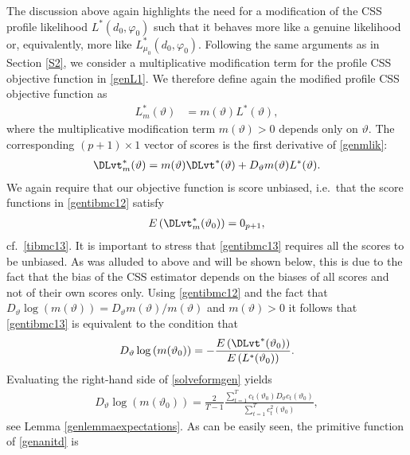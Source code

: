 {{The discussion above again highlights the need for a modification of the CSS profile likelihood $L^*(d_0,\varphi_0)$ such that it behaves more like a genuine likelihood or, equivalently, more like  $L_{\mu_0}^*(d_0,\varphi_0)$. Following the same arguments as in Section \ref{S2}, we consider a multiplicative modification term for the profile CSS objective function in \eqref{genL1}. We therefore define again the modified profile CSS objective function as  
\begin{align}
    L^*_{m}(\vartheta) &= m(\vartheta) L^*(\vartheta),  \label{genmlik}
\end{align}
where the multiplicative modification term $m(\vartheta) > 0$ depends only on $\vartheta$. The corresponding $(p+1)\times1$ vector of scores is the first derivative of \eqref{genmlik}:
\begin{align}
    \DLvt^*_{m}(\vartheta) = m(\vartheta) \DLvt^*(\vartheta) +  D_{\vartheta} m(\vartheta)   L^*(\vartheta). \label{gentibmc12}
\end{align}
We again require that our objective function is score unbiased, i.e.\ that the score functions in \eqref{gentibmc12} satisfy
\begin{align}
    E \left( \DLvt^*_{m}(\vartheta_0)  \right) = 0_{p+1}, \label{gentibmc13}
\end{align}
cf.\ \eqref{tibmc13}. It is important to stress that \eqref{gentibmc13} requires all the scores to be unbiased. As was alluded to above and will be shown below, this is due to the fact that the bias of the CSS estimator depends on the biases of all scores and not of their own scores only. Using \eqref{gentibmc12} and the fact that $ D_{\vartheta}\log (m(\vartheta)) = D_{\vartheta} m(\vartheta) /m(\vartheta)$ and $m(\vartheta) > 0$ it follows that \eqref{gentibmc13} is equivalent to the condition that
\begin{align}
     D_{\vartheta} \log\left( m(\vartheta_0) \right) = -\frac{E\left( \DLvt^*(\vartheta_0) \right)}{E\left(L^*(\vartheta_0) \right)}. \label{solveformgen}
\end{align}
Evaluating the right-hand side of \eqref{solveformgen} yields
\begin{align}
  D_{\vartheta} \log\left( m(\vartheta_0) \right) = \frac{2}{T-1} \frac{ \sum_{t = 1}^T c_t(\vartheta_0)  D_{\vartheta}c_t(\vartheta_0)   }{  \sum_{t = 1}^T  c^2_t(\vartheta_0) }, \label{genanitd}
\end{align}
see Lemma \ref{genlemmaexpectations}.
As can be easily seen, the primitive function of \eqref{genanitd} is
}}
